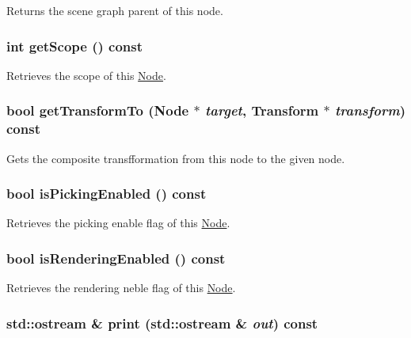 Returns the scene graph parent of this node. \hypertarget{classm3g_1_1Node_a3c291c19cf805338fa4ad3c3deb663a}{
\subsubsection[{getScope}]{\setlength{\rightskip}{0pt plus 5cm}int getScope () const}}
\label{classm3g_1_1Node_a3c291c19cf805338fa4ad3c3deb663a}


Retrieves the scope of this \hyperlink{classm3g_1_1Node}{Node}. \hypertarget{classm3g_1_1Node_206a2e95eb7db42e6880414f77858113}{
\subsubsection[{getTransformTo}]{\setlength{\rightskip}{0pt plus 5cm}bool getTransformTo ({\bf Node} $\ast$ {\em target}, \/  {\bf Transform} $\ast$ {\em transform}) const}}
\label{classm3g_1_1Node_206a2e95eb7db42e6880414f77858113}


Gets the composite transfformation from this node to the given node. \hypertarget{classm3g_1_1Node_b3187e5056afa4a94af03e34125c86b1}{
\subsubsection[{isPickingEnabled}]{\setlength{\rightskip}{0pt plus 5cm}bool isPickingEnabled () const}}
\label{classm3g_1_1Node_b3187e5056afa4a94af03e34125c86b1}


Retrieves the picking enable flag of this \hyperlink{classm3g_1_1Node}{Node}. \hypertarget{classm3g_1_1Node_95020b155afed9552cc55377b09b1e86}{
\subsubsection[{isRenderingEnabled}]{\setlength{\rightskip}{0pt plus 5cm}bool isRenderingEnabled () const}}
\label{classm3g_1_1Node_95020b155afed9552cc55377b09b1e86}


Retrieves the rendering neble flag of this \hyperlink{classm3g_1_1Node}{Node}. \hypertarget{classm3g_1_1Node_6fea17fa1532df3794f8cb39cb4f911f}{
\subsubsection[{print}]{\setlength{\rightskip}{0pt plus 5cm}std::ostream \& print (std::ostream \& {\em out}) const}}
\label{classm3g_1_1Node_6fea17fa1532df3794f8cb39cb4f911f}


